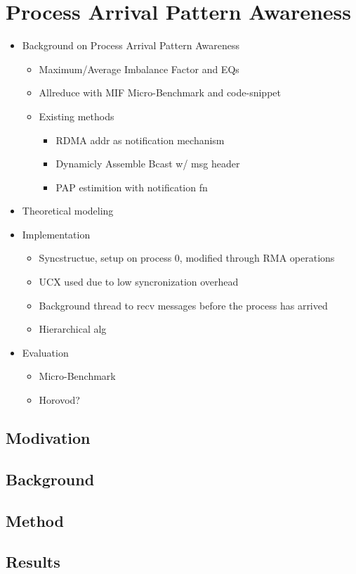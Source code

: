 
\glsresetall %
\chapter[PAPAwareness]{Process Arrival Pattern Awareness}\label{ch:PAPAwareness}

\begin{itemize}
    \item Background on Process Arrival Pattern Awareness
    \begin{itemize}
        \item Maximum/Average Imbalance Factor and EQs
        \item Allreduce with MIF Micro-Benchmark and code-snippet
        \item Existing methods
        \begin{itemize}
            \item RDMA addr as notification mechanism \cite{Qian2009ProcArrivalSHMA2AIB}
            \item Dynamicly Assemble Bcast w/ msg header \cite{Patarasuk2008EffBcastDifProcArr}
            \item PAP estimition with notification fn \cite{Proficz2018ImprvAllReduceForImbPAP, Proficz2020PAPAwareScatterGather, Proficz2021AllGatherResilientToImbPAP}
        \end{itemize}
    \end{itemize}
    \item Theoretical modeling
    \item Implementation
    \begin{itemize}
        \item Syncstructue, setup on process 0, modified through RMA operations
        \item UCX used due to low syncronization overhead
        \item Background thread to recv messages before the process has arrived 
        \item Hierarchical alg 
    \end{itemize}
    \item Evaluation
    \begin{itemize}
        \item Micro-Benchmark
        \item Horovod?
    \end{itemize}
\end{itemize}

\section{Modivation}
\section{Background}
\section{Method}
\section{Results}